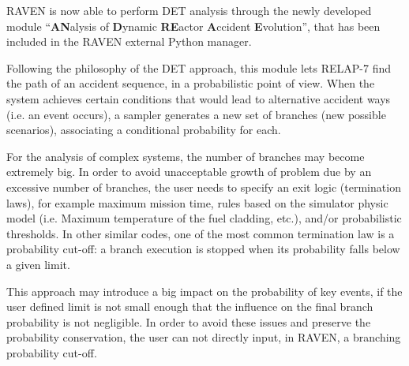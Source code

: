 \label{sec:DETRavenApproach}
RAVEN is now able to perform DET analysis through the newly developed module ``\textbf{AN}alysis of \textbf{D}ynamic \textbf{RE}actor \textbf{A}ccident \textbf{E}volution'', that has been included in the RAVEN external Python manager. 

Following the philosophy of the DET approach, this module lets RELAP-7 find the path of an accident sequence, in a probabilistic point of view. When the system achieves certain conditions that would lead to alternative accident ways (i.e. an event occurs), a sampler generates a new set of branches (new possible scenarios), associating a conditional probability for each.  

For the analysis of complex systems, the number of branches may become extremely big. In order to avoid unacceptable growth of problem due by an excessive number of branches, the user needs to specify an exit logic (termination laws), for example maximum mission time, rules based on the simulator physic model (i.e. Maximum temperature of the fuel cladding, etc.), and/or probabilistic thresholds. In other similar codes, one of the most common termination law is a probability cut-off: a branch execution is stopped when its probability falls below a given limit. 
 
This approach may introduce a big impact on the probability of key events, if the user defined limit is not small enough that the influence on the final branch probability is not negligible.  In order to avoid these issues and preserve the probability conservation, the user can not directly input, in RAVEN, a branching probability cut-off. 


